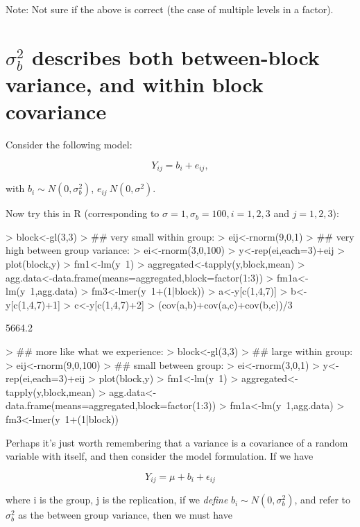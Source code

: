 \documentclass[12pt]{amsart}
\begin{document}
Note: Not sure if the above is correct (the case of multiple levels in a factor).

\section{$\sigma_b^2$ describes both between-block variance, and within block covariance}

Consider the following model:

\begin{equation}
Y_{ij} = b_i + e_{ij},
\end{equation}


with $b_i\sim N(0,\sigma^2_b)$, $e_{ij}~N(0,\sigma^2)$.

Now try this in R (corresponding to $\sigma=1, \sigma_b=100, i=1,2,3$ and $j=1,2,3$):

\begin{Schunk}
\begin{Sinput}
> block<-gl(3,3)
> ## very small within group:
> eij<-rnorm(9,0,1)
> ## very high between group variance:
> ei<-rnorm(3,0,100)
> y<-rep(ei,each=3)+eij
> plot(block,y)
> fm1<-lm(y~1)
> aggregated<-tapply(y,block,mean)
> agg.data<-data.frame(means=aggregated,block=factor(1:3))
> fm1a<-lm(y~1,agg.data)
> fm3<-lmer(y~1+(1|block))
> a<-y[c(1,4,7)]
> b<-y[c(1,4,7)+1]
> c<-y[c(1,4,7)+2]
> (cov(a,b)+cov(a,c)+cov(b,c))/3
\end{Sinput}
\begin{Soutput}
[1] 5664.2
\end{Soutput}
\begin{Sinput}
> ## more like what we experience:
> block<-gl(3,3)
> ## large within group:
> eij<-rnorm(9,0,100)
> ## small between group:
> ei<-rnorm(3,0,1)
> y<-rep(ei,each=3)+eij
> plot(block,y)
> fm1<-lm(y~1)
> aggregated<-tapply(y,block,mean)
> agg.data<-data.frame(means=aggregated,block=factor(1:3))
> fm1a<-lm(y~1,agg.data)
> fm3<-lmer(y~1+(1|block))
\end{Sinput}
\end{Schunk}

Perhaps it's just worth remembering that a variance is a covariance of a random variable with itself, and then consider the model formulation. If we have

\begin{equation}
Y_{ij} = \mu + b_i + \epsilon_{ij}
\end{equation}

where i is the group, j is the replication, if we \textit{define} $b_i\sim N(0, \sigma^2_b)$, and refer to $\sigma^2_b$ as the between group variance, then we must have
\end{document}
